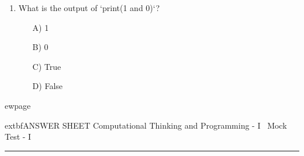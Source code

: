\documentclass[9pt]{article}
\begin{document}
\begin{multicols}{2}
\begin{enumerate}
\item What is the output of `print(1 and 0)`?
\begin{enumerate}
\item[A)] 1
\item[B)] 0
\item[C)] True
\item[D)] False
\end{enumerate}

\end{enumerate}

\end{multicols}


ewpage

\pagestyle{plain}
\begin{center}
{\huge 	extbf{ANSWER SHEET}} 
\vspace{0.5em}
{\Large Computational Thinking and Programming - I \ Mock Test - I} 
\vspace{0.5em}
\hrule
\end{center}

\vspace{1em}
\end{document}
